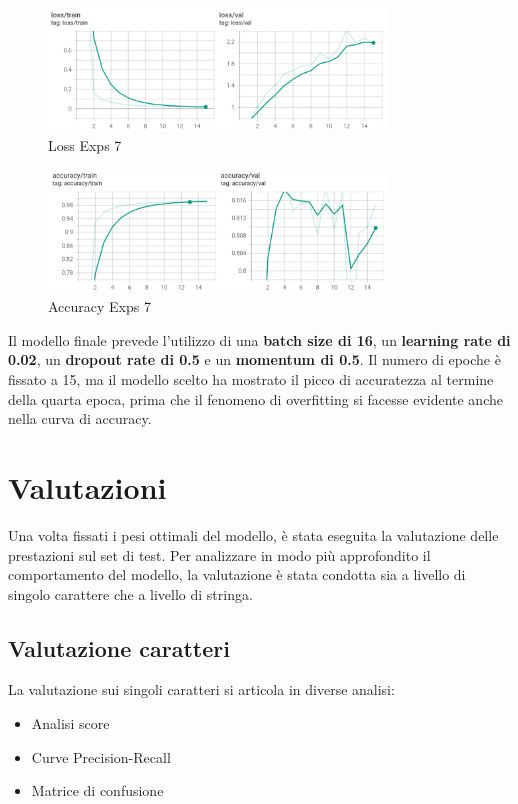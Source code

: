\begin{figure}[htbp]
    \centering
    \includegraphics[width=0.8\textwidth]{images/exps7_loss.png}
    \caption{Loss Exps 7}
    \label{fig:exps7_loss}
\end{figure}

\begin{figure}[htbp]
    \centering
    \includegraphics[width=0.8\textwidth]{images/exps7_accuracy.png}
    \caption{Accuracy Exps 7}
    \label{fig:exps7_acc}
\end{figure}



Il modello finale prevede l'utilizzo di una \textbf{batch size di 16}, un \textbf{learning rate di 0.02}, un \textbf{dropout rate di 0.5} e un \textbf{momentum di 0.5}. Il numero di epoche è fissato a 15, ma il modello scelto ha mostrato il picco di accuratezza al termine della quarta epoca, prima che il fenomeno di overfitting si facesse evidente anche nella curva di accuracy.

\section{Valutazioni}
\label{sec:valutazioni}
Una volta fissati i pesi ottimali del modello, è stata eseguita la valutazione delle prestazioni sul set di test. Per analizzare in modo più approfondito il comportamento del modello, la valutazione è stata condotta sia a livello di singolo carattere che a livello di stringa.

\subsection{Valutazione caratteri}
La valutazione sui singoli caratteri si articola in diverse analisi:
\begin{itemize}
    \item Analisi score
    \item Curve Precision-Recall
    \item Matrice di confusione
\end{itemize}

